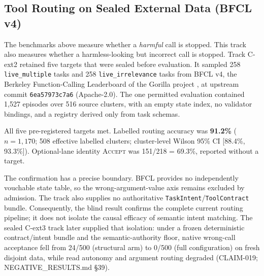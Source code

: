 \documentclass[10pt,twocolumn]{article}
\begin{document}
\subsection{Tool Routing on Sealed External Data (BFCL v4)}
\label{sec:routing-blind}

The benchmarks above measure whether a \emph{harmful} call is stopped. This
track also measures whether a harmless-looking but incorrect call is stopped.
Track C-ext2 retained five targets that were sealed before evaluation. It
sampled 258 \texttt{live\_multiple} tasks and 258
\texttt{live\_irrelevance} tasks from BFCL v4, the Berkeley
Function-Calling Leaderboard \cite{patil2025bfcl} of the Gorilla project
\cite{patil2023gorilla}, at upstream commit
\texttt{6ea57973c7a6} (Apache-2.0). The one permitted evaluation contained
1{,}527 episodes over 516 source clusters, with an empty state index, no
validator bindings, and a registry derived only from task schemas.

\begin{center}
\small
{}
\end{center}

All five pre-registered targets met. Labelled routing accuracy was
\textbf{91.2\%} ($n=1{,}170$; 508 effective labelled clusters; cluster-level
Wilson 95\% CI [88.4\%, 93.3\%]). Optional-lane identity \textsc{Accept} was
151/218 = 69.3\%, reported without a target.

The confirmation has a precise boundary. BFCL provides no independently
vouchable state table, so the wrong-argument-value axis remains excluded by
admission. The track also supplies no authoritative
\texttt{TaskIntent}/\texttt{ToolContract} bundle. Consequently, the blind
result confirms the complete current routing pipeline; it does not isolate the
causal efficacy of semantic intent matching. The sealed C-ext3 track later
supplied that isolation: under a frozen deterministic contract/intent bundle
and the semantic-authority floor, native wrong-call acceptance fell from
24/500 (structural arm) to 0/500 (full configuration) on fresh disjoint data,
while read autonomy and argument routing degraded (CLAIM-019;
NEGATIVE\_RESULTS.md \S39).
\end{document}

